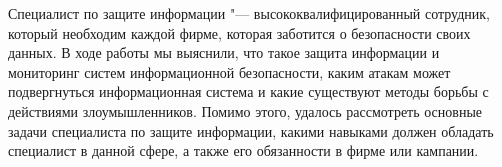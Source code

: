 Специалист по защите информации "--- высококвалифицированный сотрудник, который необходим каждой фирме,
которая заботится о безопасности своих данных. В ходе работы мы выяснили, что такое защита информации и мониторинг систем информационной безопасности, каким атакам
может подвергнуться информационная система и какие существуют методы борьбы с действиями злоумышленников. Помимо этого,
удалось рассмотреть основные задачи специалиста по защите информации, какими навыками должен обладать специалист в данной сфере,
а также его обязанности в фирме или кампании.